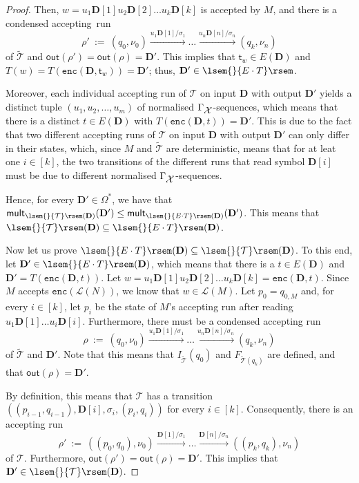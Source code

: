 \documentclass[
a4paper
]{article}
\theoremstyle{plain}
\theoremstyle{definition}
\theoremstyle{remark}
\newcommand{\varset}{\mbox{\ensuremath{\mathcal{X}}}}
\newcommand{\doc}{\ensuremath{\mathbf{D}}}
\newcommand{\getSpanTuple}[1]{\textsf{t}_{#1}}
\newcommand{\lang}[1]{\ensuremath{\mathcal{L}(#1)}}
\newcommand{\nrefw}[1]{\ensuremath{\mathtt{enc}(#1)}}
\newcommand{\mult}[2]{\operatorname{mult}_{#1}(#2)}
\newcommand{\sst}{\mathcal{T}}
\newcommand{\out}{\operatorname{out}}
\newcommand{\sem}[1]{{\lsem{}{#1}\rsem}}
\renewcommand{\operatorname}[1]{\textsf{#1}}
\begin{document}
\begin{proof}
Then, $w = u_1 \doc[1] u_2 \doc[2] \ldots u_k \doc[k]$ is accepted by $M$, and there is a condensed accepting~run
\begin{equation*}
\rho' \ := \ (q_0, \nu_0) \xrightarrow{u_1 \doc[1]/\sigma_1} \ldots \xrightarrow{u_n \doc[n]/\sigma_{n}} (q_k, \nu_n)
\end{equation*}
of $\widetilde{\sst}$ and $\out(\rho') = \out(\rho) = \doc'$. This implies that $\getSpanTuple{w} \in E(\doc)$ and $T(w) =  T(\nrefw{\doc, \getSpanTuple{w}}) = \doc'$; thus, $\doc' \in \sem{E \cdot T}$.

Moreover, each individual accepting run of $\sst$ on input $\doc$ with output $\doc'$ yields a distinct tuple $(u_1, u_2, \ldots, u_m)$ of normalised $\Gamma_{\varset}$-sequences, which means that there is a distinct $t \in E(\doc)$ with $T(\nrefw{\doc, t}) = \doc'$. This is due to the fact that two different accepting runs of $\sst$ on input $\doc$ with output $\doc'$ can only differ in their states, which, since $M$ and $\widetilde{\sst}$ are deterministic, means that for at leat one $i \in [k]$, the two transitions of the different runs that read symbol $\doc[i]$ must be due to different normalised $\Gamma_{\varset}$-sequences. 

Hence, for every $\doc' \in \Omega^*$, we have that $\mult{\sem{\sst}(\doc)}{\doc'} \leq \mult{\sem{E \cdot T}(\doc)}{\doc'}$. This means that $\sem{\sst}(\doc) \subseteq \sem{E \cdot T}(\doc)$.

Now let us prove $\sem{E \cdot T}(\doc) \subseteq \sem{\sst}(\doc)$. To this end, let $\doc' \in \sem{E \cdot T}(\doc)$, which means that there is a $t \in E(\doc)$ and $\doc' = T(\nrefw{\doc, t})$. Let $w = u_1 \doc[1] u_2 \doc[2] \ldots u_k \doc[k] = \nrefw{\doc, t}$. Since $M$ accepts $\nrefw{\lang{N}}$, we know that $w \in \lang{M}$. Let $p_0 = q_{0, M}$ and, for every $i \in [k]$, let $p_{i}$ be the state of $M$'s accepting run after reading $u_1 \doc[1] \ldots u_i \doc[i]$. Furthermore, there must be a condensed accepting run 
\begin{equation*}
\rho \ := \ (q_0, \nu_0) \xrightarrow{u_1 \doc[1]/\sigma_1} \ldots \xrightarrow{u_n \doc[n]/\sigma_{n}} (q_k, \nu_n)
\end{equation*}
of $\widetilde{\sst}$ and $\doc'$. Note that this means that $I_{\widetilde{\sst}}(q_0)$ and $F_{\widetilde{\sst}(q_k)}$ are defined, and that $\out(\rho) = \doc'$. 

By definition, this means that $\sst$ has a transition $((p_{i-1}, q_{i-1}), \doc[i], \sigma_i, (p_i, q_i))$ for every $i \in [k]$. Consequently, there is an accepting run
\begin{equation*}
\rho' \ := \ ((p_0, q_0), \nu_0) \xrightarrow{\doc[1]/\sigma_1} 
\ldots \xrightarrow{\doc[n]/\sigma_{n}} ((p_k, q_k), \nu_n)
\end{equation*}
of $\sst$. Furthermore, $\out(\rho') = \out(\rho) = \doc'$. This implies that $\doc' \in \sem{\sst}(\doc)$. 


\end{proof}
\end{document}

